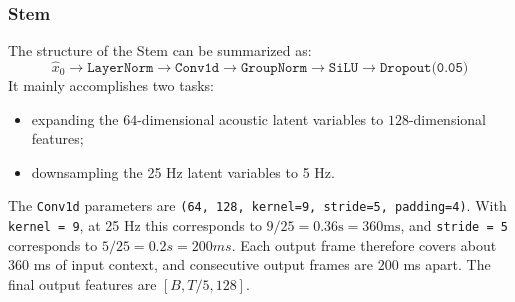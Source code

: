 \documentclass{article}
\begin{document}

\subsubsection{Stem}

The structure of the Stem can be summarized as:
\[\hat{x}_0 \to \texttt{LayerNorm} \to \texttt{Conv1d} \to \texttt{GroupNorm} \to \texttt{SiLU} \to \texttt{Dropout(0.05)}\]
It mainly accomplishes two tasks:
\begin{itemize}
    \item expanding the $64$-dimensional acoustic latent variables to $128$-dimensional features;
    \item downsampling the 25 Hz latent variables to 5 Hz.
\end{itemize}
The \verb|Conv1d| parameters are \verb|(64, 128, kernel=9, stride=5, padding=4)|. With \verb|kernel = 9|, at 25 Hz this corresponds to $9/25=0.36 \text{s}=360 \text{ms}$, and \verb|stride = 5| corresponds to $5/25=0.2s=200ms$. Each output frame therefore covers about $360$ ms of input context, and consecutive output frames are $200$ ms apart. The final output features are $[B, T/5, 128]$.
\end{document}
